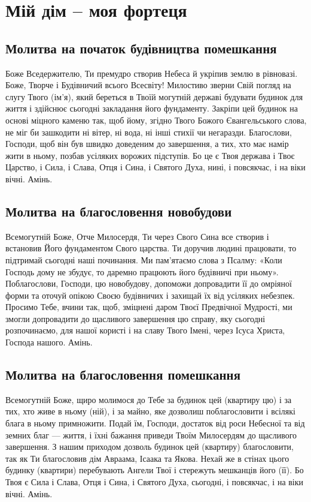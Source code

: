 \documentclass[chapters.tex]{subfiles}
\begin{document}
\chapter{Мій дім -- моя фортеця}
\section{Молитва на початок будівництва помешкання}
Боже Вседержителю, Ти премудро створив Небеса й укріпив землю в рівновазі. Боже, Творче і Будівничий всього Всесвіту! Милостиво зверни Свій погляд на слугу Твого (ім’я), який береться в Твоїй могутній державі будувати будинок для життя і здійснює сьогодні закладання його фундаменту. Закріпи цей будинок на основі міцного каменю так, щоб йому, згідно Твого Божого Євангельського слова, не міг би зашкодити ні вітер, ні вода, ні інші стихії чи негаразди. Благослови, Господи, щоб він був швидко доведеним до завершення, а тих, хто має намір жити в ньому, позбав усіляких ворожих підступів. Бо це є Твоя держава і Твоє Царство, і Сила, і Слава, Отця і Сина, і Святого Духа, нині, і повсякчас, і на віки вічні. Амінь.

\section{Молитва на благословення новобудови}
Всемогутній Боже, Отче Милосердя, Ти через Свого Сина все створив і встановив Його фундаментом Свого царства. Ти доручив людині працювати, то підтримай сьогодні наші починання. Ми пам’ятаємо слова з Псалму: «Коли Господь дому не збудує, то даремно працюють його будівничі при ньому». Поблагослови, Господи, цю новобудову, допоможи допровадити її до омріяної форми та оточуй опікою Своєю будівничих і захищай їх від усіляких небезпек. Просимо Тебе, вчини так, щоб, зміцнені даром Твоєї Предвічної Мудрості, ми змогли допровадити до щасливого завершення цю справу, яку сьогодні розпочинаємо, для нашої користі і на славу Твого Імені, через Ісуса Христа, Господа нашого. Амінь.

\section{Молитва на благословення помешкання}
Всемогутній Боже, щиро молимося до Тебе за будинок цей (квартиру цю) і за тих, хто живе в ньому (ній), і за майно, яке дозволиш поблагословити і всілякі блага в ньому примножити. Подай їм, Господи, достаток від роси Небесної та від земних благ — життя, і їхні бажання приведи Твоїм Милосердям до щасливого завершення. З нашим приходом дозволь будинок цей (квартиру) благословити, так як Ти благословив дім Авраама, Ісаака та Якова. Нехай же в стінах цього будинку (квартири) перебувають Ангели Твої і стережуть мешканців його (її). Бо Твоя є Сила і Слава, Отця і Сина, і Святого Духа, сьогодні, і повсякчас, і на віки вічні. Амінь.
\end{document}
